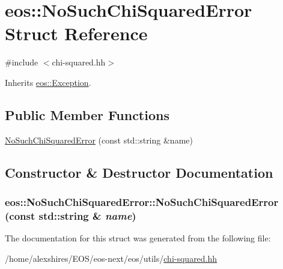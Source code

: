 \hypertarget{structeos_1_1NoSuchChiSquaredError}{
\section{eos::NoSuchChiSquaredError Struct Reference}
\label{structeos_1_1NoSuchChiSquaredError}
}


{\ttfamily \#include $<$chi-\/squared.hh$>$}

Inherits \hyperlink{classeos_1_1Exception}{eos::Exception}.\subsection*{Public Member Functions}
\begin{DoxyCompactItemize}
\item 
\hyperlink{structeos_1_1NoSuchChiSquaredError_afe6bd8a569bff7d6485a42416402b0f5}{NoSuchChiSquaredError} (const std::string \&name)
\end{DoxyCompactItemize}


\subsection{Constructor \& Destructor Documentation}
\hypertarget{structeos_1_1NoSuchChiSquaredError_afe6bd8a569bff7d6485a42416402b0f5}{
\subsubsection[{NoSuchChiSquaredError}]{\setlength{\rightskip}{0pt plus 5cm}eos::NoSuchChiSquaredError::NoSuchChiSquaredError (const std::string \& {\em name})}}
\label{structeos_1_1NoSuchChiSquaredError_afe6bd8a569bff7d6485a42416402b0f5}


The documentation for this struct was generated from the following file:\begin{DoxyCompactItemize}
\item 
/home/alexshires/EOS/eos-\/next/eos/utils/\hyperlink{chi-squared_8hh}{chi-\/squared.hh}\end{DoxyCompactItemize}
